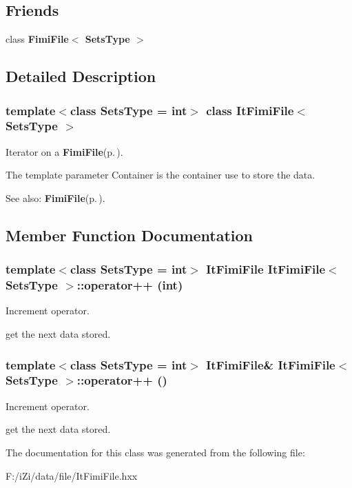 \subsection*{Friends}
\begin{CompactItemize}
\item 
class {\bf Fimi\-File$<$ Sets\-Type $>$}\label{class_it_fimi_file_26481749a1d5964abcc437208e9c1013}

\end{CompactItemize}


\subsection{Detailed Description}
\subsubsection*{template$<$class Sets\-Type = int$>$ class It\-Fimi\-File$<$ Sets\-Type $>$}

Iterator on a {\bf Fimi\-File}{\rm (p.\,\pageref{class_fimi_file})}. 

The template parameter Container is the container use to store the data. \begin{Desc}
\item[See also:]{\bf Fimi\-File}{\rm (p.\,\pageref{class_fimi_file})}. \end{Desc}




\subsection{Member Function Documentation}
\subsubsection{\setlength{\rightskip}{0pt plus 5cm}template$<$class Sets\-Type = int$>$ {\bf It\-Fimi\-File} {\bf It\-Fimi\-File}$<$ Sets\-Type $>$::operator++ (int)\hspace{0.3cm}{\tt  [inline]}}\label{class_it_fimi_file_44783f44e41095e7b9930a62dfc7ec12}


Increment operator. 

get the next data stored. 
\subsubsection{\setlength{\rightskip}{0pt plus 5cm}template$<$class Sets\-Type = int$>$ {\bf It\-Fimi\-File}\& {\bf It\-Fimi\-File}$<$ Sets\-Type $>$::operator++ ()\hspace{0.3cm}{\tt  [inline]}}\label{class_it_fimi_file_614bd34a7dad419043dc2ce43578beca}


Increment operator. 

get the next data stored. 

The documentation for this class was generated from the following file:\begin{CompactItemize}
\item 
F:/i\-Zi/data/file/It\-Fimi\-File.hxx\end{CompactItemize}

